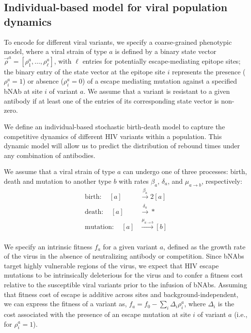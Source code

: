 \documentclass[11pt]{article}
\begin{document}
\subsection{Individual-based model for viral population dynamics}
To encode for different viral variants,  we specify a coarse-grained phenotypic model, where a viral strain of type $a$ is defined by a binary state vector $\vec \rho^a = [\rho^a_1,\dots,\rho^a_\ell]$, with $\ell$ entries for potentially escape-mediating epitope sites; the binary entry of the state vector at the epitope site $i$ represents the presence ($\rho^a_i=1$) or absence ($\rho^a_i=0$)  of a escape mediating mutation against a specified bNAb at  site $i$ of  variant $a$. We assume that a variant is resistant to a given antibody if at least one of the entries of its corresponding state vector is non-zero.

We define an individual-based stochastic birth-death model \cite{wilkinsonStochasticModellingSystems2019a} to capture the competitive dynamics of different HIV variants within a population. This dynamic model will allow us to predict the distribution of rebound times under any combination of antibodies. 

We assume that a viral strain of type $a$ can undergo one of three processes: birth, death and mutation to another type $b$ with rates $\beta_a$, $\delta_a$, and $\mu_{a\to b}$, respectively:
\begin{align*}
\text{birth}:\quad [a] 
&\overset{\beta_a}{\longrightarrow} 2[a] \\
\text{death}:\quad [a] 
&\overset{\delta_a}{\longrightarrow}  * \\
\text{mutation}:\quad [a] 
&\overset{\mu_{a\to b }}{\longrightarrow}  [b]\\
\end{align*}

We specify  an intrinsic fitness $f_a$ for a given variant $a$, 
	defined as the growth rate of the virus in the absence of neutralizing antibody or competition. Since bNAbs target highly vulnerable regions of the virus,	we expect that   HIV escape mutations to be intrinsically deleterious for the virus and to confer a fitness cost relative to the susceptible viral variants  prior to the infusion of bNAbs. Assuming that fitness cost of escape is additive across sites and background-independent, we can express the fitness of a variant as,  
	$f_a  =  f_0 - \sum_{i} \Delta_{i} \rho_{i}^{a} $, where $\Delta_i$ is the cost associated with the presence of an escape mutation at site $i$ of variant $a$ (i.e., for $\rho_i^a =1$).
	
\end{document}
